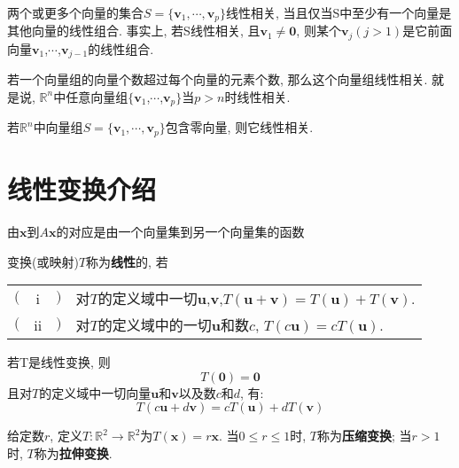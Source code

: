 \begin{TheoremTwo}[线性相关集的特征]
两个或更多个向量的集合$S=\{\bm{v}_1,\cdots,\bm{v}_p\}$线性相关, 当且仅当S中至少有一个向量是其他向量的线性组合. 事实上, 若S线性相关, 且$\bm{v}_1\neq\bm{0}$, 则某个$\bm{v}_j$$(j>1)$是它前面向量$\bm{v}_1$,$\cdots$,$\bm{v}_{j-1}$的线性组合.
\end{TheoremTwo}\vspace{4ex}

\begin{TheoremOne}
若一个向量组的向量个数超过每个向量的元素个数, 那么这个向量组线性相关. 就是说, $\mathbb{R}^n$中任意向量组$\{\bm{v}_1$,$\cdots$,$\bm{v}_p\}$当$p>n$时线性相关.
\end{TheoremOne}\vspace{4ex}

\begin{TheoremOne}
若$\mathbb{R}^n$中向量组$S=\{\bm{v}_1,\cdots,\bm{v}_p\}$包含零向量, 则它线性相关.
\end{TheoremOne}\vspace{4ex}

\section{线性变换介绍}
由$\bm{x}$到$A\bm{x}$的对应是由一个向量集到另一个向量集的函数\\[2ex]

\begin{definition}
变换(或映射)$T$称为\textbf{线性}的, 若\\
\begin{tabular}{l@{}c@{}l@{\hspace{2pt}}l}
$($ & i & $)$ & 对$T$的定义域中一切$\bm{u}$,$\bm{v}$,$T(\bm{u}+\bm{v})=T(\bm{u})+T(\bm{v})$.\\
$($ & ii & $)$ & 对$T$的定义域中的一切$\bm{u}$和数$c$, $T(c\bm{u})=cT(\bm{u})$.
\end{tabular}
\end{definition}\vspace{4ex}

\begin{law}
若T是线性变换, 则
\[T(\bm{0})=\bm{0}\]
且对$T$的定义域中一切向量$\bm{u}$和$\bm{v}$以及数$c$和$d$, 有:
\[T(c\bm{u}+d\bm{v})=cT(\bm{u})+dT(\bm{v})\]
\end{law}\vspace{2ex}

给定数$r$, 定义$T:\mathbb{R}^2\rightarrow\mathbb{R}^2$为$T(\bm{x})=r\bm{x}$. 当$0\leqslant r\leqslant 1$时, $T$称为\textbf{压缩变换}; 当$r>1$时, $T$称为\textbf{拉伸变换}.\\[4ex]

